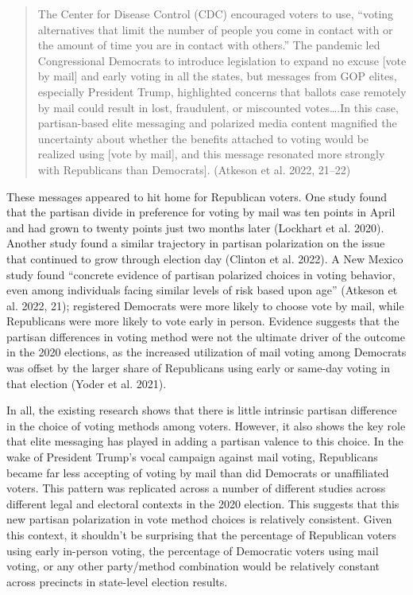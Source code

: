 \documentclass[12pt]{article}
\begin{document}
\begin{quote}
The Center for Disease Control (CDC) encouraged voters to use, ``voting alternatives that limit the number of people you come in contact with or the amount of time you are in contact with others.'' The pandemic led Congressional Democrats to introduce legislation to expand no excuse {[}vote by mail{]} and early voting in all the states, but messages from GOP elites, especially President Trump, highlighted concerns that ballots case remotely by mail could result in lost, fraudulent, or miscounted votes\ldots.In this case, partisan-based elite messaging and polarized media content magnified the uncertainty about whether the benefits attached to voting would be realized using {[}vote by mail{]}, and this message resonated more strongly with Republicans than Democrats{]}. (Atkeson et al. 2022, 21--22)
\end{quote}

These messages appeared to hit home for Republican voters. One study found that the partisan divide in preference for voting by mail was ten points in April and had grown to twenty points just two months later (Lockhart et al. 2020). Another study found a similar trajectory in partisan polarization on the issue that continued to grow through election day (Clinton et al. 2022). A New Mexico study found ``concrete evidence of partisan polarized choices in voting behavior, even among individuals facing similar levels of risk based upon age'' (Atkeson et al. 2022, 21); registered Democrats were more likely to choose vote by mail, while Republicans were more likely to vote early in person. Evidence suggests that the partisan differences in voting method were not the ultimate driver of the outcome in the 2020 elections, as the increased utilization of mail voting among Democrats was offset by the larger share of Republicans using early or same-day voting in that election (Yoder et al. 2021).

In all, the existing research shows that there is little intrinsic partisan difference in the choice of voting methods among voters. However, it also shows the key role that elite messaging has played in adding a partisan valence to this choice. In the wake of President Trump's vocal campaign against mail voting, Republicans became far less accepting of voting by mail than did Democrats or unaffiliated voters. This pattern was replicated across a number of different studies across different legal and electoral contexts in the 2020 election. This suggests that this new partisan polarization in vote method choices is relatively consistent. Given this context, it shouldn't be surprising that the percentage of Republican voters using early in-person voting, the percentage of Democratic voters using mail voting, or any other party/method combination would be relatively constant across precincts in state-level election results.
\end{document}
